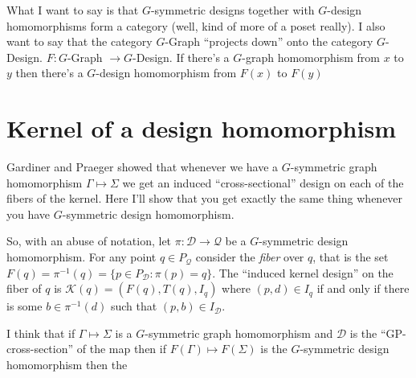 \documentclass[12pt]{amsart}
\theoremstyle{plain}
\theoremstyle{definition}
\theoremstyle{remark}
\newcommand{\cD}{\mathcal{D}}
\newcommand{\cQ}{\mathcal{Q}}
\newcommand{\cK}{\mathcal{K}}
\begin{document}
What I want to say is that $G$-symmetric designs
together with $G$-design homomorphisms form a category
(well, kind of more of a poset really).
I also want to say that the category $G$-Graph
``projects down'' onto the category $G$-Design.
$F : G$-Graph $\to G$-Design.
If there's a $G$-graph homomorphism from $x$ to $y$
then there's a $G$-design homomorphism from $F(x)$ to $F(y)$

\section{Kernel of a design homomorphism}

Gardiner and Praeger showed that whenever we have
a $G$-symmetric graph homomorphism $\Gamma \mapsto \Sigma$
we get an induced ``cross-sectional'' design
on each of the fibers of the kernel.
Here I'll show that you get exactly the same thing
whenever you have $G$-symmetric design homomorphism.

So, with an abuse of notation, let $\pi : \cD \to \cQ$
be a $G$-symmetric design homomorphism.
For any point $q \in P_\cQ$
consider the {\it fiber} over $q$, 
that is the set $F(q) = \pi^{-1}(q) = \{ p \in P_\cD : \pi(p) = q \}$.
The ``induced kernel design'' on the fiber of $q$
is $\cK(q) = (F(q), T(q), I_q)$
where $(p,d) \in I_q$ if and only if there is some $b \in \pi^{-1}(d)$
such that $(p,b) \in I_\cD$. 

I think that if $\Gamma \mapsto \Sigma$ is a $G$-symmetric graph
homomorphism and $\cD$ is the ``GP-cross-section'' of the map
then if $F(\Gamma) \mapsto F(\Sigma)$ is the $G$-symmetric design
homomorphism then the 
\end{document}
